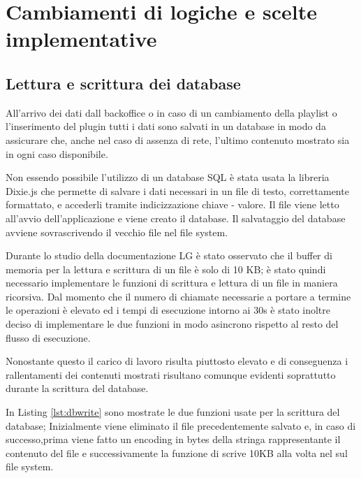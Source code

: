 \section{Cambiamenti di logiche e scelte implementative}
\subsection{Lettura e scrittura dei database} \label{database}

All'arrivo dei dati dall backoffice o in caso di un cambiamento della playlist o l'inserimento del plugin tutti i dati sono salvati in un database in modo da assicurare che, anche nel caso di assenza di rete, l'ultimo contenuto mostrato sia in ogni caso disponibile.

Non essendo possibile l'utilizzo di un database SQL è stata usata la libreria Dixie.js \cite{dixie} che permette di salvare i dati necessari in un file di testo, correttamente formattato, e accederli tramite indicizzazione chiave - valore. Il file viene letto all'avvio dell'applicazione e viene creato il database. Il salvataggio del database avviene sovrascrivendo il vecchio file nel file system.

Durante lo studio della documentazione LG è stato osservato che il buffer di memoria per la lettura e scrittura di un file è solo di 10 KB; è stato quindi necessario implementare le funzioni di scrittura e lettura di un file in maniera ricorsiva.
Dal momento che il numero di chiamate necessarie a portare a termine le operazioni è elevato ed i tempi di esecuzione intorno ai 30s è stato inoltre deciso di implementare le due funzioni in modo asincrono rispetto al resto del flusso di esecuzione. 

Nonostante questo il carico di lavoro risulta piuttosto elevato e di conseguenza i rallentamenti dei contenuti mostrati risultano comunque evidenti soprattutto durante la scrittura del database. 



In Listing \ref*{lst:dbwrite} sono mostrate le due funzioni usate per la scrittura del database; Inizialmente viene eliminato il file precedentemente salvato e, in caso di successo,prima viene fatto un encoding in bytes della stringa rappresentante il contenuto del file e successivamente la funzione di  scrive 10KB alla volta nel sul file system.

